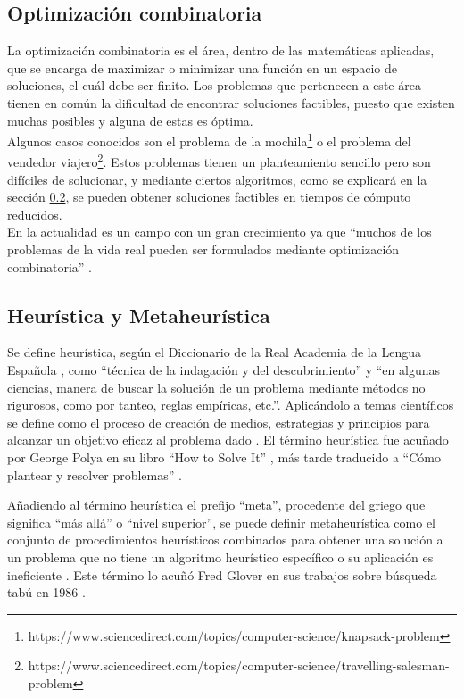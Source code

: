 \subsection{Optimización combinatoria}
La optimización combinatoria es el área, dentro de las matemáticas aplicadas, que se encarga de maximizar o minimizar una función en un espacio de soluciones, el cuál debe ser finito. Los problemas que pertenecen a este área tienen en común la dificultad de encontrar soluciones factibles, puesto que existen muchas posibles y alguna de estas es óptima.\\
Algunos casos conocidos son el problema de la mochila\footnote{https://www.sciencedirect.com/topics/computer-science/knapsack-problem} o el problema del vendedor viajero\footnote{https://www.sciencedirect.com/topics/computer-science/travelling-salesman-problem}. Estos problemas tienen un planteamiento sencillo pero son difíciles de solucionar, y mediante ciertos algoritmos, como se explicará en la sección \ref{sec:heu-meta}, se pueden obtener soluciones factibles en tiempos de cómputo reducidos.\\
En la actualidad es un campo con un gran crecimiento ya que ``muchos de los problemas de la vida real pueden ser formulados mediante optimización combinatoria'' \cite{opt-comb-rg}.

\subsection{Heurística y Metaheurística}
\label{sec:heu-meta}
Se define heurística, según el Diccionario de la Real Academia de la Lengua Española \cite{rae-heuristica}, como ``técnica de la indagación y del descubrimiento'' y ``en algunas ciencias, manera de buscar la solución de un problema mediante métodos no rigurosos, como por tanteo, reglas empíricas, etc.''. Aplicándolo a temas científicos se define como el proceso de creación de medios, estrategias y principios para alcanzar un objetivo eficaz al problema dado \cite{conceptodef-heuristica}. El término heurística fue acuñado por George Polya en su libro ``How to Solve It'' \cite{gpolya-book-1}, más tarde traducido a ``Cómo plantear y resolver problemas'' \cite{gpolya-book-2}.

Añadiendo al término heurística el prefijo ``meta'', procedente del griego que significa ``más allá'' o ``nivel superior'', se puede definir metaheurística como el conjunto de procedimientos heurísticos combinados para obtener una solución a un problema que no tiene un algoritmo heurístico específico o su aplicación es ineficiente \cite{wiki-metaheuristica}. Este término lo acuñó Fred Glover en sus trabajos sobre búsqueda tabú en 1986 \cite{fred-glover}.

